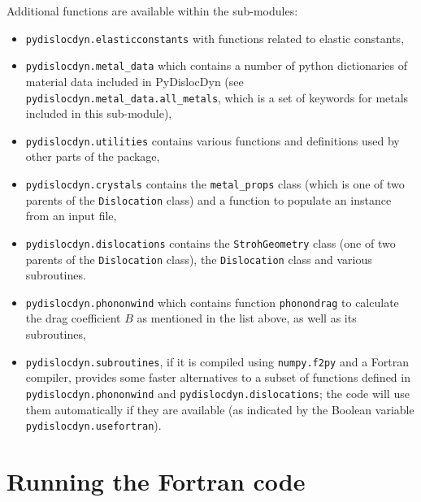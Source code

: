 \documentclass[11pt,letterpaper,oneside]{article}
\begin{document}
Additional functions are available within the sub-modules:
\begin{itemize}
	\item \verb|pydislocdyn.elasticconstants| with functions related to elastic constants,
	\item \verb|pydislocdyn.metal_data| which contains a number of python dictionaries of material data included in PyDislocDyn (see \verb|pydislocdyn.metal_data.all_metals|, which is a set of keywords for metals included in this sub-module),
	\item \verb|pydislocdyn.utilities| contains various functions and definitions used by other parts of the package,
	\item \verb|pydislocdyn.crystals| contains the \verb|metal_props| class (which is one of two parents of the \verb|Dislocation| class) and a function to populate an instance from an input file,
	\item \verb|pydislocdyn.dislocations| contains the \verb|StrohGeometry| class (one of two parents of the \verb|Dislocation| class),  the \verb|Dislocation| class and various subroutines.
	\item \verb|pydislocdyn.phononwind| which contains function \verb|phonondrag| to calculate the drag coefficient $B$ as mentioned in the list above, as well as its subroutines,
	\item \verb|pydislocdyn.subroutines|, if it is compiled using \verb|numpy.f2py| and a Fortran compiler, provides some faster alternatives to a subset of functions defined in \verb|pydislocdyn.phononwind| and \verb|pydislocdyn.dislocations|; the code will use them automatically if they are available (as indicated by the Boolean variable \verb|pydislocdyn.usefortran|).
\end{itemize}


\section{Running the Fortran code}
\label{sec:fortran}
\end{document}
